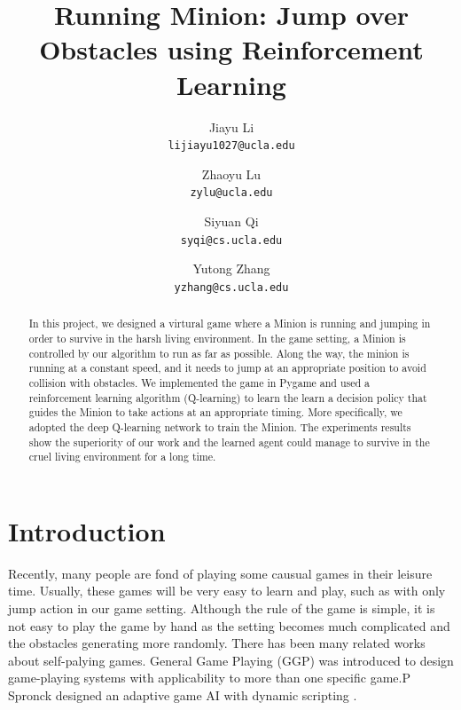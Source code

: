 \documentclass{acmsiggraph}
\title{Running Minion:  Jump over Obstacles using Reinforcement Learning}
\author{
  Jiayu Li \\
  \texttt{lijiayu1027@ucla.edu}
  \and
  Zhaoyu Lu \\
  \texttt{zylu@ucla.edu}
  \and
  Siyuan Qi \\
  \texttt{syqi@cs.ucla.edu}
  \and
  Yutong Zhang \\
  \texttt{yzhang@cs.ucla.edu}
  }
\begin{document}


\maketitle

\begin{abstract}

In this project, we designed a virtural game where a Minion is running and jumping in order to survive in the harsh living environment. In the game setting, a Minion is controlled by our algorithm to run as far as possible. Along the way, the minion is running at a constant speed, and it needs to jump at an appropriate position to avoid collision with obstacles. We implemented the game in Pygame and used a reinforcement learning algorithm (Q-learning) to learn the learn a decision policy that guides the Minion to take actions at an appropriate timing. More specifically, we adopted the deep Q-learning network to train the Minion. The experiments results show the superiority of our work and the learned agent could manage to survive in the cruel living environment for a long time.

\end{abstract}

\section{Introduction}
Recently, many people are fond of playing some causual games in their leisure time. Usually, these games will be very easy to learn and play, such as with only jump action in our game setting. Although the rule of  the game is simple, it is not easy to play the game by hand as the setting becomes much complicated and the obstacles generating more randomly. There has been many related works about self-palying games.  General Game Playing (GGP)\cite{genesereth2005general} was introduced to design game-playing systems with applicability to more than one specific game.P Spronck designed an adaptive game AI with dynamic scripting \cite{spronck2006adaptive}.
\end{document}
